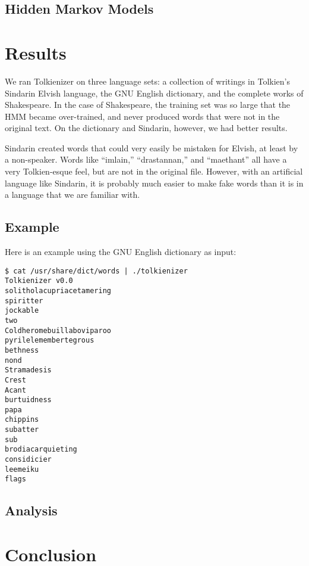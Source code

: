 \documentclass[twocolumn]{article}
\begin{document}
\subsection{Hidden Markov Models}

\section{Results}

We ran Tolkienizer on three language sets: a collection of writings in Tolkien's Sindarin Elvish language, the GNU English dictionary, and the complete works of Shakespeare.  In the case of Shakespeare, the training set was so large that the HMM became over-trained, and never produced words that were not in the original text.  On the dictionary and Sindarin, however, we had better results.

Sindarin created words that could very easily be mistaken for Elvish, at least by a non-speaker.  Words like ``imlain,'' ``drastannan,'' and ``maethant'' all have a very Tolkien-esque feel, but are not in the original file.  However, with an artificial language like Sindarin, it is probably much easier to make fake words than it is in a language that we are familiar with.

\subsection{Example}

Here is an example using the GNU English dictionary as input:

\begin{verbatim}
$ cat /usr/share/dict/words | ./tolkienizer 
Tolkienizer v0.0
solitholacupriacetamering
spiritter
jockable
two
Coldheromebuillaboviparoo
pyrilelemembertegrous
bethness
nond
Stramadesis
Crest
Acant
burtuidness
papa
chippins
subatter
sub
brodiacarquieting
considicier
leemeiku
flags
\end{verbatim}

\subsection{Analysis}

\section{Conclusion}
\end{document}
